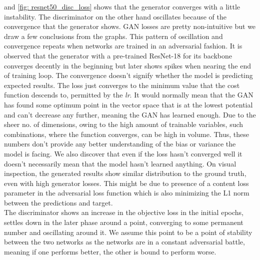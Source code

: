 \documentclass[10pt,twocolumn,letterpaper]{article}
\begin{document}
     and \cref{fig: resnet50_disc_loss} shows that the generator converges with a little instability. The discriminator on the other hand oscillates because of the convergence that the generator shows. GAN losses are pretty non-intuitive but we draw a few conclusions from the graphs. This pattern of oscillation and convergence repeats when networks are trained in an adversarial fashion. It is observed that the generator with a pre-trained ResNet-18 for its backbone converges decently in the beginning but later shows spikes when nearing the end of training loop. The convergence doesn't signify whether the model is predicting expected results. The loss just converges to the minimum value that the cost function descends to, permitted by the \textit{lr}. It would normally mean that the GAN has found some optimum point in the vector space that is at the lowest potential and can't decrease any further, meaning the GAN has learned enough. Due to the sheer no. of dimensions, owing to the high amount of trainable variables, such combinations, where the function converges, can be high in volume. Thus, these numbers don't provide any better understanding of the bias or variance the model is facing. We also discover that even if the loss hasn't converged well it doesn't necessarily mean that the model hasn't learned anything. On visual inspection, the generated results show similar distribution to the ground truth, even with high generator losses. This might be due to presence of a content loss parameter in the adversarial loss function which is also minimizing the L1 norm between the predictions and target.\\
    \hspace*{0.167 in}The discriminator shows an increase in the objective loss in the initial epochs, settles down in the later phase around a point, converging to some permanent number and oscillating around it. We assume this point to be a point of stability between the two networks as the networks are in a constant adversarial battle, meaning if one performs better, the other is bound to perform worse.
\end{document}
